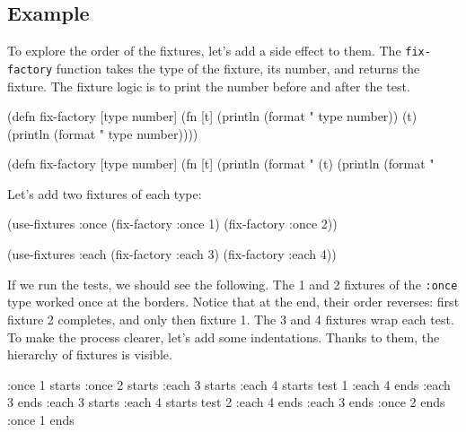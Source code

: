 \subsection{Example}

To explore the order of the fixtures, let's add a side effect to them. The \verb|fix-factory| function takes the type of the fixture, its number, and returns the fixture. The fixture logic is to print the number before and after the test.


\ifnarrow

\begin{english}
  \begin{clojure}
(defn fix-factory [type number]
  (fn [t]
    (println (format "%
               type number))
    (t)
    (println (format "%
               type number))))
  \end{clojure}
\end{english}

\else

\begin{english}
  \begin{clojure}
(defn fix-factory [type number]
  (fn [t]
    (println (format "%
    (t)
    (println (format "%
  \end{clojure}
\end{english}

\fi

\noindent
Let's add two fixtures of each type:

\begin{english}
  \begin{clojure}
(use-fixtures :once
  (fix-factory :once 1)
  (fix-factory :once 2))

(use-fixtures :each
  (fix-factory :each 3)
  (fix-factory :each 4))
  \end{clojure}
\end{english}

If we run the tests, we should see the following. The 1 and 2 fixtures of the \verb|:once| type worked once at the borders. Notice that at the end, their order reverses: first fixture 2 completes, and only then fixture 1. The 3 and 4 fixtures wrap each test. To make the process clearer, let's add some indentations. Thanks to them, the hierarchy of fixtures is visible.


\begin{english}
  \begin{clojure}
:once 1 starts
  :once 2 starts
    :each 3 starts
      :each 4 starts
        test 1
      :each 4 ends
    :each 3 ends
    :each 3 starts
      :each 4 starts
        test 2
      :each 4 ends
    :each 3 ends
  :once 2 ends
:once 1 ends
  \end{clojure}
\end{english}

